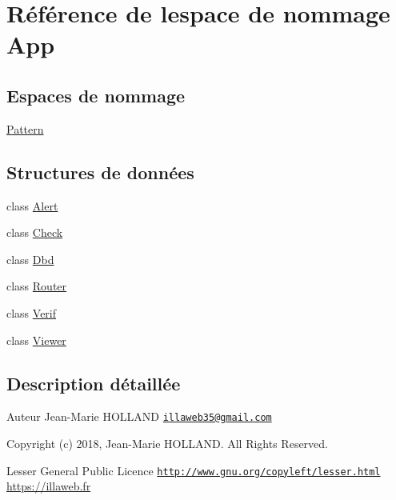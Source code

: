 \hypertarget{namespace_app}{}\section{Référence de l\textquotesingle{}espace de nommage App}
\label{namespace_app}
\subsection*{Espaces de nommage}
\begin{DoxyCompactItemize}
\item 
 \hyperlink{namespace_app_1_1_pattern}{Pattern}
\end{DoxyCompactItemize}
\subsection*{Structures de données}
\begin{DoxyCompactItemize}
\item 
class \hyperlink{class_app_1_1_alert}{Alert}
\item 
class \hyperlink{class_app_1_1_check}{Check}
\item 
class \hyperlink{class_app_1_1_dbd}{Dbd}
\item 
class \hyperlink{class_app_1_1_router}{Router}
\item 
class \hyperlink{class_app_1_1_verif}{Verif}
\item 
class \hyperlink{class_app_1_1_viewer}{Viewer}
\end{DoxyCompactItemize}


\subsection{Description détaillée}
\begin{DoxyAuthor}{Auteur}
Jean-\/\+Marie H\+O\+L\+L\+A\+ND \href{mailto:illaweb35@gmail.com}{\tt illaweb35@gmail.\+com} 
\end{DoxyAuthor}
\begin{DoxyCopyright}{Copyright}
(c) 2018, Jean-\/\+Marie H\+O\+L\+L\+A\+ND. All Rights Reserved.
\end{DoxyCopyright}
Lesser General Public Licence \href{http://www.gnu.org/copyleft/lesser.html}{\tt http\+://www.\+gnu.\+org/copyleft/lesser.\+html} \hyperlink{}{https\+://illaweb.\+fr}